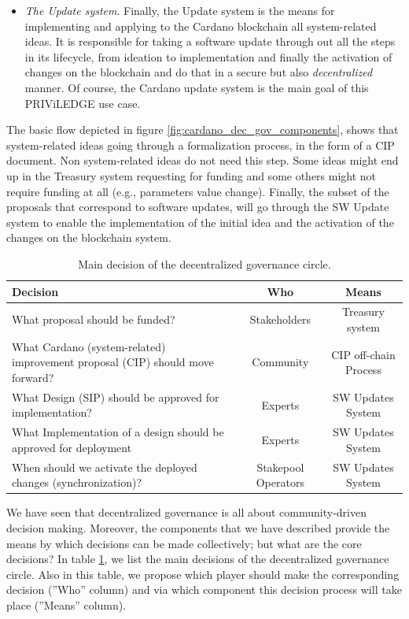 \begin{itemize}
	\item \emph{The Update system}. Finally, the Update system is the means for 
	implementing and applying to the Cardano blockchain all system-related 
	ideas. It is responsible for taking a software update through out all the 
	steps in its lifecycle, from ideation to implementation and finally the 
	activation of changes on the blockchain and do that in a secure but also 
	\emph{decentralized} manner.
	Of course, the Cardano update system is the main goal of this 
	PRIViLEDGE use case.
\end{itemize}
The basic flow depicted in figure \ref{fig:cardano_dec_gov_components}, shows 
that system-related ideas going through a formalization process, in the form of 
a CIP document. Non system-related ideas do not need this step. Some ideas 
might 
end up in the Treasury system 
requesting for funding and some others might not require funding at all (e.g., 
parameters value change). Finally, the subset of the proposals that correspond 
to software updates, will go through the SW 
Update system to enable the implementation of the initial idea and the 
activation of the changes on the blockchain system.

\begin{table}[h!]
	\centering
	\begin{tabular}{|| p{6cm} | c | c ||} 
		\hline
		Decision & Who & Means\\ [0.5ex] 
		\hline\hline
		What proposal should be funded? & Stakeholders & Treasury system  \\ 
		\hline
		What Cardano (system-related) improvement proposal (CIP) should move 
		forward? & Community & CIP off-chain Process  \\
		\hline
		What Design (SIP) should be approved for implementation? & Experts & SW 
		Updates System  \\
		\hline
		What Implementation of a design should be approved for deployment & 
		Experts & SW Updates System  \\
		\hline
		When should we activate the deployed changes (synchronization)? & 
		Stakepool Operators & SW Updates System  \\ [1ex] 
		\hline
	\end{tabular}
	\caption{Main decision of the decentralized governance circle.}
	\label{table:main_decisions}
\end{table}

We have seen that decentralized governance is all about community-driven 
decision making. Moreover, the components that we have described provide the 
means by which decisions can be made collectively; but what are the core 
decisions? In table \ref{table:main_decisions}, we list the main decisions of 
the decentralized governance circle. Also in this table, we propose which 
player 
should make the corresponding decision (''Who'' column) and via 
which component this decision process will take place (''Means'' column).

